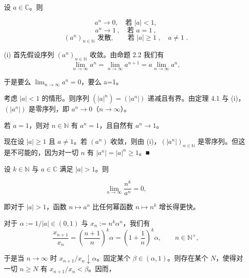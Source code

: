 \begin{example}

\begin{items}
\item

设  $ a \in \mathbb{C} $。则

\[
a^{n}\to0,\quad\text{若 }|a|<1,
\]
\[
a^{n}\to1~,\quad\text{若 }a=1~,
\]
\[
(a^{n})_{n\in\mathbb{N}}\text{ 发散},\qquad\text{若 }|a|\geq1\;,\quad a\neq1\;.
\]

\begin{subitems}
\item

\proofhead
(i) 首先假设序列  $ (a^n)_{n\in\mathbb{N}} $ 收敛。由命题 2.2 我们有
\[
\lim_{n\to\infty}a^{n}=\lim_{n\to\infty}a^{n+1}=a\lim_{n\to\infty}a^{n},
\]

于是要么  $ \lim_{n\to\infty}a^n=0 $，要么 a=1。

\item

考虑  $ |a| < 1 $ 的情形。则序列  $ (|a|^n) = (|a^n|) $ 递减且有界。由定理 4.1 与 (i)，$ (|a^n|) $ 是零序列，即  $ a^n \to 0 $（$ n \to \infty $）。

\item

若  $ a = 1 $，则对  $ n \in \mathbb{N} $ 有  $ a^n = 1 $，且自然有  $ a^n \to 1 $。

\item

现在设  $ |a| \geq 1 $ 且  $ a \neq 1 $。若  $ (a^n) $ 收敛，则由 (i)，$ (|a^n|)_{n \in \mathbb{N}} $ 是零序列。但这是不可能的，因为对一切  $ n $ 有  $ |a^n| = |a|^n \geq 1 $。■

\end{subitems}

\item

设  $ k \in \mathbb{N} $ 与  $ a \in \mathbb{C} $ 满足  $ |a| > 1 $。则

\[
\lim_{n\to\infty}\frac{n^{k}}{a^{n}}=0,
\]

即对于  $ |a| > 1 $，函数  $ n \mapsto a^n $ 比任何幂函数  $ n \mapsto n^k $ 增长得更快。

\proofhead
对于  $ \alpha := 1/|a| \in (0,1) $ 与  $ x_n := n^k \alpha^n $，我们有
\[
\frac{x_{n+1}}{x_{n}}=\left(\frac{n+1}{n}\right)^{k}\alpha=\left(1+\frac{1}{n}\right)^{k}\alpha,\qquad n\in\mathbb{N}^{\times},
\]

于是当  $ n \to \infty $ 时  $ x_{n+1}/x_n \downarrow \alpha $。固定某个  $ \beta \in (\alpha,1) $。则存在某个  $ N $，使得对一切  $ n \geq N $ 有  $ x_{n+1}/x_n < \beta $。因而，


\end{items}
\end{example}
